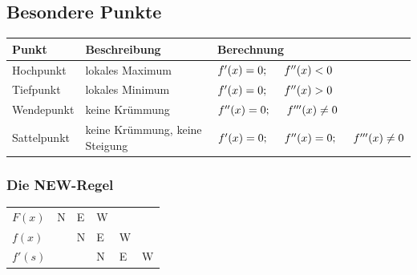 \documentclass[a4paper, 15pt]{article}
\begin{document}
\subsection{Besondere Punkte}
\begin{table}[h]
\renewcommand{\arraystretch}{2}
\begin{tabularx}{\columnwidth}{|l|X|X|}
\hline
\textbf{Punkt}&\textbf{Beschreibung}&\textbf{Berechnung} \\
\hline
\hline
Hochpunkt&lokales Maximum&$f'(x)=0;\hspace{.5cm} f''(x)<0$ \\
\hline
Tiefpunkt&lokales Minimum&$f'(x)=0;\hspace{.5cm} f''(x)>0$ \\
\hline
Wendepunkt&keine Krümmung&$f''(x)=0;\hspace{.5cm} f'''(x)\neq0$ \\
\hline
Sattelpunkt&keine Krümmung, keine Steigung&$f'(x)=0;\hspace{.5cm} f''(x)=0;\hspace{.5cm}f'''(x)\neq0$ \\
\hline
\end{tabularx}
\end{table}
\subsubsection{Die NEW-Regel}
\begin{minipage}{.45\textwidth}
\begin{center}
\end{center}
\end{minipage}
\hspace{1cm}
\begin{minipage}{.45\textwidth}
\begin{center}
\begin{tabularx}{\columnwidth}{lXXXXX}
$F(x)$&N&E&W&& \\
$f(x)$&&N&E&W& \\
$f'(s)$&&&N&E&W \\
\end{tabularx}
\end{center}
\end{minipage}
\end{document}
